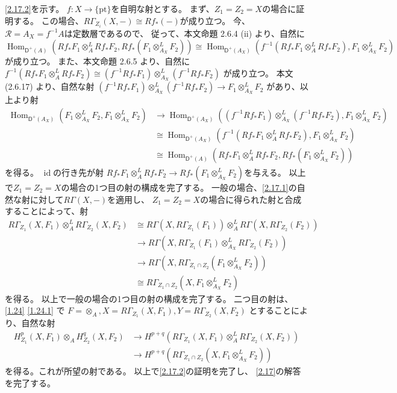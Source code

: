 \documentclass[uplatex,dvipdfmx]{jsarticle}
\makeatletter
\theoremstyle{definition}
\renewenvironment{proof}[1][\proofname]{
  \pushQED{\qed}%
  \normalfont \topsep6\p@\@plus6\p@\relax
  \trivlist
  \item[\hskip\labelsep
    #1\@addpunct{\textbf{.}}]\ignorespaces
}{%
  \popQED\endtrivlist\@endpefalse
}
\providecommand{\proofname}{証明}
\DeclareMathOperator{\Hom}{\mathrm{Hom}}
\DeclareMathOperator{\id}{\mathrm{id}}
\newcommand{\sfD}{\mathsf{D}}
\newcommand\mcR{\mathcal{R}}
\makeatother
\begin{document}
\begin{proof}
  \ref{2.17.2}を示す。
  \(f:X\to \{\mathrm{pt}\}\)を自明な射とする。
  まず、\(Z_1=Z_2=X\)の場合に証明する。
  この場合、\(R\Gamma_{Z_i}(X,-)\cong Rf_*(-)\)が成り立つ。
  今、\(\mcR = A_X = f^{-1}A\)は定数層であるので、
  従って、本文命題 2.6.4 (ii) より、自然に
  \[
  \Hom_{\sfD^+(A)}(Rf_*F_1\otimes_A^L Rf_*F_2, Rf_*(F_1\otimes_{A_X}^L F_2))
  \cong \Hom_{\sfD^+(A_X)}(f^{-1}(Rf_*F_1\otimes_A^L Rf_*F_2),F_1\otimes_{A_X}^L F_2)
  \]
  が成り立つ。
  また、本文命題 2.6.5 より、自然に
  \(f^{-1}(Rf_*F_1\otimes_A^L Rf_*F_2)\cong
  (f^{-1}Rf_*F_1)\otimes_{A_X}^L (f^{-1}Rf_*F_2)\)
  が成り立つ。
  本文 (2.6.17) より、自然な射
  \((f^{-1}Rf_*F_1)\otimes_{A_X}^L (f^{-1}Rf_*F_2)\to F_1\otimes_{A_X}^LF_2\)
  があり、以上より射
  \begin{align*}
    \Hom_{\sfD^+(A_X)}(F_1\otimes_{A_X}^LF_2,F_1\otimes_{A_X}^L F_2)
    &\to \Hom_{\sfD^+(A_X)}((f^{-1}Rf_*F_1)\otimes_{A_X}^L (f^{-1}Rf_*F_2)
    ,F_1\otimes_{A_X}^L F_2) \\
    &\cong \Hom_{\sfD^+(A_X)}(f^{-1}(Rf_*F_1\otimes_A^L Rf_*F_2), F_1\otimes_{A_X}^L F_2) \\
    &\cong \Hom_{\sfD^+(A)}(Rf_*F_1\otimes_A^L Rf_*F_2, Rf_*(F_1\otimes_{A_X}^L F_2))
  \end{align*}
  を得る。
  \(\id\)の行き先が射
  \(Rf_*F_1\otimes_A^L Rf_*F_2\to Rf_*(F_1\otimes_{A_X}^L F_2)\)を与える。
  以上で\(Z_1=Z_2=X\)の場合の1つ目の射の構成を完了する。
  一般の場合、\ref{2.17.1}の自然な射に対して\(R\Gamma(X,-)\)を適用し、
  \(Z_1=Z_2=X\)の場合に得られた射と合成することによって、射
  \begin{align*}
    R\Gamma_{Z_1}(X,F_1)\otimes_A^L R\Gamma_{Z_2}(X,F_2)
    &\cong R\Gamma(X,R\Gamma_{Z_1}(F_1))\otimes_A^L R\Gamma(X,R\Gamma_{Z_2}(F_2)) \\
    &\to R\Gamma(X,R\Gamma_{Z_1}(F_1)\otimes_{A_X}^L R\Gamma_{Z_2}(F_2)) \\
    &\to R\Gamma(X,R\Gamma_{Z_1\cap Z_2}(F_1\otimes_{A_X}^L F_2)) \\
    &\cong R\Gamma_{Z_1\cap Z_2}(X,F_1\otimes_{A_X}^L F_2)
  \end{align*}
  を得る。
  以上で一般の場合の1つ目の射の構成を完了する。
  二つ目の射は、\autoref{1.24} \ref{1.24.1} で
  \(F=\otimes_A, X=R\Gamma_{Z_1}(X,F_1), Y=R\Gamma_{Z_2}(X,F_2)\)
  とすることにより、自然な射
  \begin{align*}
    H^p_{Z_1}(X,F_1)\otimes_A H^q_{Z_2}(X,F_2)
    &\to H^{p+q}(R\Gamma_{Z_1}(X,F_1)\otimes_A^L R\Gamma_{Z_2}(X,F_2)) \\
    &\to H^{p+q}(R\Gamma_{Z_1\cap Z_2}(X,F_1\otimes_{A_X}^L F_2))
  \end{align*}
  を得る。これが所望の射である。
  以上で\ref{2.17.2}の証明を完了し、
  \autoref{2.17}の解答を完了する。
\end{proof}
\end{document}
